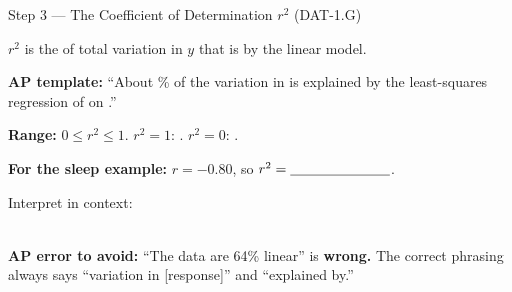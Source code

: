 \documentclass[10pt]{article}
\begin{document}
\begin{notesbox}{Step 3 --- The Coefficient of Determination $r^2$ (DAT-1.G)}
\small

\noindent $r^2$ is the \blank{3.5cm} of total variation in $y$ that is \blank{4.5cm}
by the linear model.

\vspace{6pt}
\textbf{AP template:} ``About \blank{2cm}\% of the variation in
\blank{3cm} is explained by the least-squares regression of
\blank{3cm} on \blank{3cm}.''

\vspace{8pt}
\textbf{Range:} $0 \leq r^2 \leq 1$.
\quad $r^2 = 1$: \blank{5cm}. \quad $r^2 = 0$: \blank{5cm}.

\vspace{8pt}
\textbf{For the sleep example:} $r = -0.80$, so $r^2 = \blank{2.5cm}$.

\vspace{4pt}
Interpret in context:\\[6pt]
\writeline\\[2pt]\writeline

\vspace{6pt}
\begin{tcolorbox}[colback=redbg, colframe=redacc, boxrule=0.8pt, arc=2mm,
    left=3mm, right=3mm, top=2mm, bottom=2mm]
\small\textbf{AP error to avoid:} ``The data are 64\% linear'' is \textbf{wrong.}
The correct phrasing always says ``variation in [response]'' and ``explained by.''
\end{tcolorbox}

\end{notesbox}

\vspace{0.1in}
\end{document}
